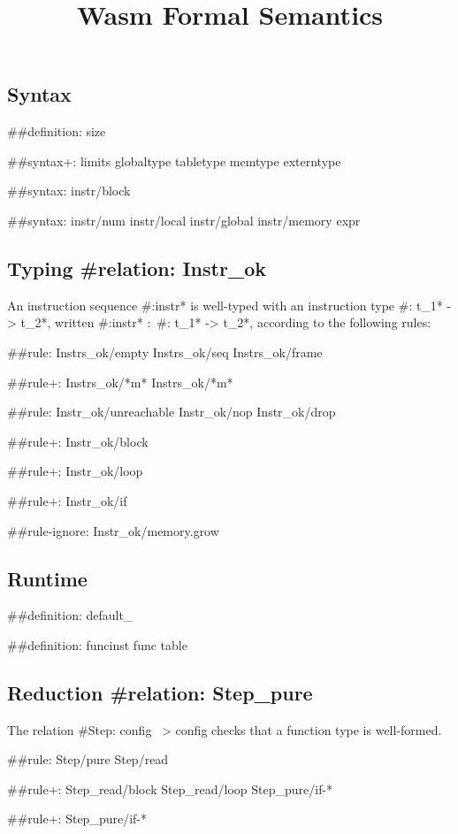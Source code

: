 \documentclass[a4paper]{scrartcl}
\title{Wasm Formal Semantics}
\begin{document}
\small

\maketitle


\subsection*{Syntax}

##{definition: size}

##{syntax+:
  limits
  {globaltype
  tabletype
  memtype}
  {}
  externtype
}

##{syntax: {instr/block}}

##{syntax: {instr/num instr/local instr/global instr/memory} expr}


\subsection*{Typing #{relation: Instr_ok}}

An instruction sequence #{:instr*} is well-typed with an instruction type #{: t_1* -> t_2*}, written #{:instr*} $:$ #{: t_1* -> t_2*}, according to the following rules:

##{rule:
  {Instrs_ok/empty Instrs_ok/seq}
  {Instrs_ok/frame}
}

##{rule+: Instrs_ok/*m* {Instrs_ok/*m*}}

##{rule: {Instr_ok/unreachable Instr_ok/nop Instr_ok/drop}}

##{rule+: Instr_ok/block}

##{rule+: Instr_ok/loop}

##{rule+: Instr_ok/if}


##{rule-ignore: Instr_ok/memory.grow}


\subsection*{Runtime}

##{definition: default_}

##{definition: {funcinst} {func table}}


\subsection*{Reduction #{relation: Step_pure}}

The relation #{Step: config ~> config} checks that a function type is well-formed.

##{rule: Step/pure Step/read}

##{rule+: {Step_read/block Step_read/loop} {Step_pure/if-*}}

##{rule+: Step_pure/if-*}
\end{document}
